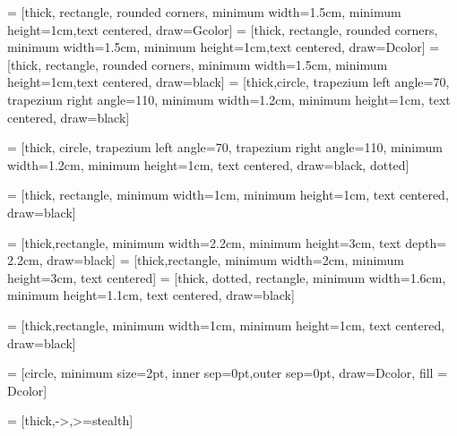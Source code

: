 \usetikzlibrary{arrows}
\usetikzlibrary{shapes.geometric, arrows}




 = [thick, rectangle, rounded corners, minimum width=1.5cm, minimum height=1cm,text centered, draw=Gcolor]
 = [thick, rectangle, rounded corners, minimum width=1.5cm, minimum height=1cm,text centered, draw=Dcolor]
 = [thick, rectangle, rounded corners, minimum width=1.5cm, minimum height=1cm,text centered, draw=black]
 = [thick,circle, trapezium left angle=70, trapezium right angle=110, minimum width=1.2cm, minimum height=1cm, text centered, draw=black]

 = [thick, circle, trapezium left angle=70, trapezium right angle=110, minimum width=1.2cm, minimum height=1cm, text centered, draw=black, dotted]

 = [thick, rectangle, minimum width=1cm, minimum height=1cm, text centered, draw=black]

 = [thick,rectangle, minimum width=2.2cm, minimum height=3cm, text depth= 2.2cm, draw=black]
 = [thick,rectangle, minimum width=2cm, minimum height=3cm, text centered]
 = [thick, dotted, rectangle, minimum width=1.6cm, minimum height=1.1cm, text centered, draw=black]


 = [thick,rectangle, minimum width=1cm, minimum height=1cm, text centered, draw=black]


 = [circle, minimum size=2pt, inner sep=0pt,outer sep=0pt, draw=Dcolor, fill = Dcolor]

 = [thick,->,>=stealth]

